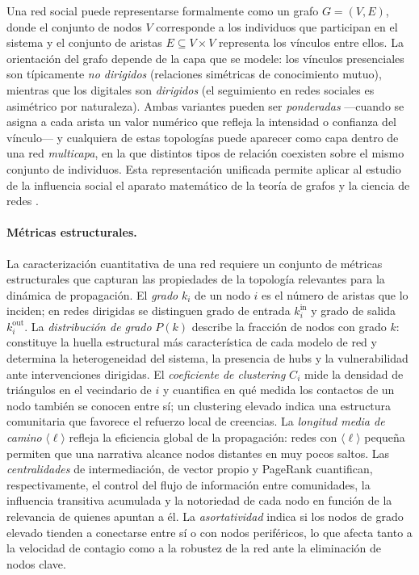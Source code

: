 
Una red social puede representarse formalmente como un grafo $G = (V, E)$, donde el conjunto de nodos $V$ corresponde a los individuos que participan en el sistema y el conjunto de aristas $E \subseteq V \times V$ representa los vínculos entre ellos. La orientación del grafo depende de la capa que se modele: los vínculos presenciales son típicamente \emph{no dirigidos} (relaciones simétricas de conocimiento mutuo), mientras que los digitales son \emph{dirigidos} (el seguimiento en redes sociales es asimétrico por naturaleza). Ambas variantes pueden ser \emph{ponderadas} —cuando se asigna a cada arista un valor numérico que refleja la intensidad o confianza del vínculo— y cualquiera de estas topologías puede aparecer como capa dentro de una red \emph{multicapa}, en la que distintos tipos de relación coexisten sobre el mismo conjunto de individuos. Esta representación unificada permite aplicar al estudio de la influencia social el aparato matemático de la teoría de grafos y la ciencia de redes \cite{AlbertBarabasi2002}.

\paragraph{Métricas estructurales.}
La caracterización cuantitativa de una red requiere un conjunto de métricas estructurales que capturan las propiedades de la topología relevantes para la dinámica de propagación. El \emph{grado} $k_i$ de un nodo $i$ es el número de aristas que lo inciden; en redes dirigidas se distinguen grado de entrada $k_i^{\text{in}}$ y grado de salida $k_i^{\text{out}}$. La \emph{distribución de grado} $P(k)$ describe la fracción de nodos con grado $k$: constituye la huella estructural más característica de cada modelo de red y determina la heterogeneidad del sistema, la presencia de hubs y la vulnerabilidad ante intervenciones dirigidas. El \emph{coeficiente de clustering} $C_i$ mide la densidad de triángulos en el vecindario de $i$ y cuantifica en qué medida los contactos de un nodo también se conocen entre sí; un clustering elevado indica una estructura comunitaria que favorece el refuerzo local de creencias. La \emph{longitud media de camino} $\langle \ell \rangle$ refleja la eficiencia global de la propagación: redes con $\langle \ell \rangle$ pequeña permiten que una narrativa alcance nodos distantes en muy pocos saltos. Las \emph{centralidades} de intermediación, de vector propio y PageRank cuantifican, respectivamente, el control del flujo de información entre comunidades, la influencia transitiva acumulada y la notoriedad de cada nodo en función de la relevancia de quienes apuntan a él. La \emph{asortatividad} indica si los nodos de grado elevado tienden a conectarse entre sí o con nodos periféricos, lo que afecta tanto a la velocidad de contagio como a la robustez de la red ante la eliminación de nodos clave.

